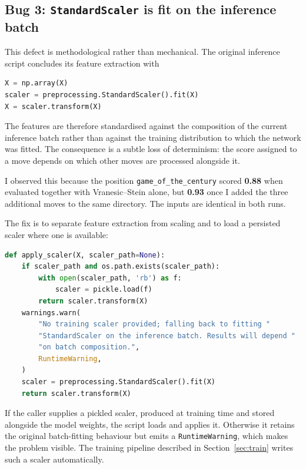 \documentclass[11pt,a4paper]{article}
\begin{document}
\subsection{Bug 3: \texttt{StandardScaler} is fit on the inference batch}
\label{sec:bug3}

This defect is methodological rather than mechanical. The original
inference script concludes its feature extraction with

\begin{lstlisting}[language=Python]
X = np.array(X)
scaler = preprocessing.StandardScaler().fit(X)
X = scaler.transform(X)
\end{lstlisting}

The features are therefore standardised against the composition of the
current inference batch rather than against the training distribution
to which the network was fitted. The consequence is a subtle loss of
determinism: the score assigned to a move depends on which other moves
are processed alongside it.

I observed this because the position
\texttt{game\_of\_the\_century} scored \textbf{0.88} when evaluated
together with Vranesic--Stein alone, but \textbf{0.93} once I added the
three additional moves to the same directory. The inputs are identical
in both runs.

The fix is to separate feature extraction from scaling and to load a
persisted scaler where one is available:

\begin{lstlisting}[language=Python]
def apply_scaler(X, scaler_path=None):
    if scaler_path and os.path.exists(scaler_path):
        with open(scaler_path, 'rb') as f:
            scaler = pickle.load(f)
        return scaler.transform(X)
    warnings.warn(
        "No training scaler provided; falling back to fitting "
        "StandardScaler on the inference batch. Results will depend "
        "on batch composition.",
        RuntimeWarning,
    )
    scaler = preprocessing.StandardScaler().fit(X)
    return scaler.transform(X)
\end{lstlisting}

If the caller supplies a pickled scaler, produced at training time and
stored alongside the model weights, the script loads and applies it.
Otherwise it retains the original batch-fitting behaviour but emits a
\texttt{RuntimeWarning}, which makes the problem visible. The training
pipeline described in Section~\ref{sec:train} writes such a scaler
automatically.
\end{document}

